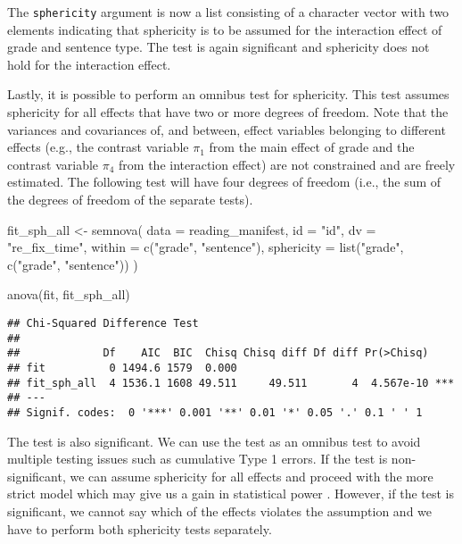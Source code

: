 \documentclass[
]{book}
\newenvironment{Shaded}{\begin{snugshade}}{\end{snugshade}}
\newcommand{\AttributeTok}[1]{\textcolor[rgb]{0.77,0.63,0.00}{#1}}
\newcommand{\FunctionTok}[1]{\textcolor[rgb]{0.00,0.00,0.00}{#1}}
\newcommand{\NormalTok}[1]{#1}
\newcommand{\OtherTok}[1]{\textcolor[rgb]{0.56,0.35,0.01}{#1}}
\newcommand{\StringTok}[1]{\textcolor[rgb]{0.31,0.60,0.02}{#1}}
\begin{document}
The \texttt{sphericity} argument is now a list consisting of a character vector with two elements indicating that sphericity is to be assumed for the interaction effect of grade and sentence type. The test is again significant and sphericity does not hold for the interaction effect.

Lastly, it is possible to perform an omnibus test for sphericity. This test assumes sphericity for all effects that have two or more degrees of freedom. Note that the variances and covariances of, and between, effect variables belonging to different effects (e.g., the contrast variable \(\pi_1\) from the main effect of grade and the contrast variable \(\pi_4\) from the interaction effect) are not constrained and are freely estimated. The following test will have four degrees of freedom (i.e., the sum of the degrees of freedom of the separate tests).

\begin{Shaded}
\begin{Highlighting}[]
\NormalTok{fit\_sph\_all }\OtherTok{\textless{}{-}} \FunctionTok{semnova}\NormalTok{(}
    \AttributeTok{data =}\NormalTok{ reading\_manifest,}
    \AttributeTok{id =} \StringTok{"id"}\NormalTok{, }
    \AttributeTok{dv =} \StringTok{"re\_fix\_time"}\NormalTok{,}
    \AttributeTok{within =} \FunctionTok{c}\NormalTok{(}\StringTok{"grade"}\NormalTok{, }\StringTok{"sentence"}\NormalTok{),}
    \AttributeTok{sphericity =} \FunctionTok{list}\NormalTok{(}\StringTok{"grade"}\NormalTok{, }\FunctionTok{c}\NormalTok{(}\StringTok{"grade"}\NormalTok{, }\StringTok{"sentence"}\NormalTok{))}
\NormalTok{)}

\FunctionTok{anova}\NormalTok{(fit, fit\_sph\_all)}
\end{Highlighting}
\end{Shaded}

\begin{verbatim}
## Chi-Squared Difference Test
## 
##             Df    AIC  BIC  Chisq Chisq diff Df diff Pr(>Chisq)    
## fit          0 1494.6 1579  0.000                                  
## fit_sph_all  4 1536.1 1608 49.511     49.511       4  4.567e-10 ***
## ---
## Signif. codes:  0 '***' 0.001 '**' 0.01 '*' 0.05 '.' 0.1 ' ' 1
\end{verbatim}

The test is also significant. We can use the test as an omnibus test to avoid multiple testing issues such as cumulative Type 1 errors. If the test is non-significant, we can assume sphericity for all effects and proceed with the more strict model which may give us a gain in statistical power \citep[e.g.,][]{Lane2016a, Muller1989a}. However, if the test is significant, we cannot say which of the effects violates the assumption and we have to perform both sphericity tests separately.
\end{document}

